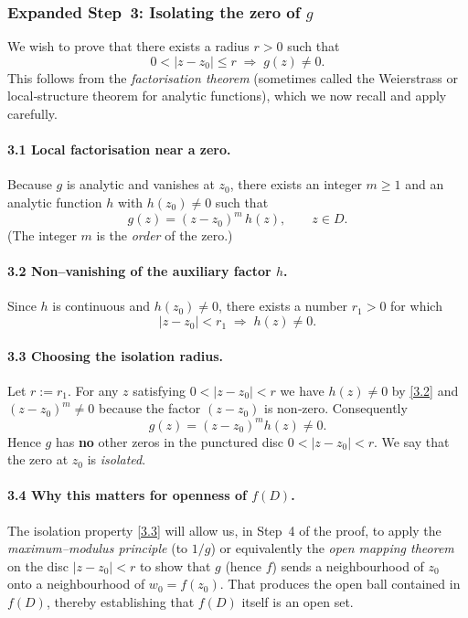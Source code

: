 \documentclass[12pt]{article}
\title{}
\author{Jerich Lee}
\date{\today}
\theoremstyle{definition} %
\theoremstyle{plain} %
\begin{document}
\maketitle
\subsubsection*{Expanded Step 3:  Isolating the zero of $g$}

We wish to prove that there exists a radius $r>0$ such that 
\[
   0<|z-z_{0}|\le r \;\Longrightarrow\; g(z)\neq0.
\]
This follows from the \emph{factorisation theorem} (sometimes called the
Weierstrass or local‐structure theorem for analytic functions), which we now
recall and apply carefully.

\paragraph{3.1  Local factorisation near a zero.}
Because $g$ is analytic and vanishes at $z_{0}$, there exists an integer
$m\ge1$ and an analytic function $h$ with $h(z_{0})\neq0$ such that  
\[
   g(z)=(z-z_{0})^{m}\,h(z),\qquad z\in D. \tag{3.1}
\]
(The integer $m$ is the \emph{order} of the zero.)

\paragraph{3.2  Non–vanishing of the auxiliary factor $h$.}
Since $h$ is continuous and $h(z_{0})\neq0$, there exists a number 
$r_{1}>0$ for which  
\[
   |z-z_{0}|<r_{1}\;\Longrightarrow\; h(z)\neq0 . \tag{3.2}
\]

\paragraph{3.3  Choosing the isolation radius.}
Let $r:=r_{1}$.  For any $z$ satisfying $0<|z-z_{0}|<r$ we have  
$h(z)\neq0$ by \eqref{3.2} and $(z-z_{0})^{m}\neq0$ because the factor
$(z-z_{0})$ is non‑zero.  Consequently
\[
   g(z)=(z-z_{0})^{m}h(z)\neq0 . \tag{3.3}
\]
Hence $g$ has \textbf{no} other zeros in the punctured disc
$0<|z-z_{0}|<r$.  We say that the zero at $z_{0}$ is \emph{isolated}.

\paragraph{3.4  Why this matters for openness of $f(D)$.}
The isolation property \eqref{3.3} will allow us, in Step 4 of the proof,
to apply the \emph{maximum–modulus principle} (to $1/g$) or equivalently
the \emph{open mapping theorem} on the disc $|z-z_{0}|<r$ to show that
$g$ (hence $f$) sends a neighbourhood of $z_{0}$ onto a neighbourhood of
$w_{0}=f(z_{0})$.  That produces the open ball contained in $f(D)$, thereby
establishing that $f(D)$ itself is an open set.
\end{document}
